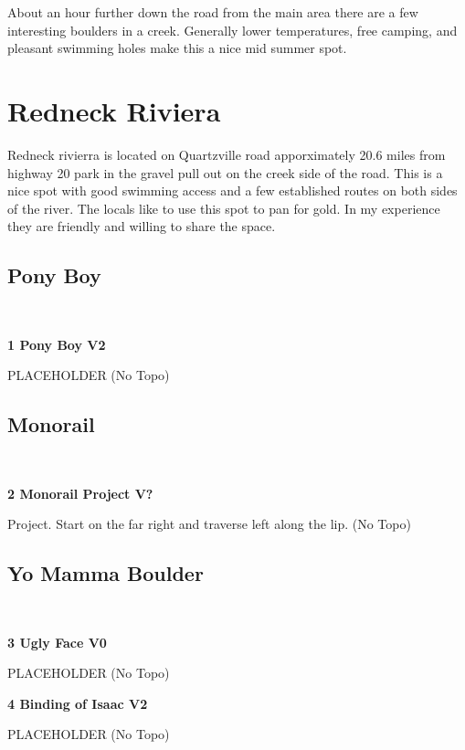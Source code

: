 \begin{multicols}{2}
About an hour further down the road from the main area there are a few interesting boulders in a creek. Generally lower temperatures, free camping, and pleasant swimming holes make this a nice mid summer spot.

		\section{Redneck Riviera}\label{sa:Redneck Riviera}
	Redneck rivierra is located on Quartzville road apporximately 20.6 miles from highway 20 park in the gravel pull out on the creek side of the road. This is a nice spot with good swimming access and a few established routes on both sides of the river. The locals like to use this spot to pan for gold. In my experience they are friendly and willing to share the space.
			\subsection*{Pony Boy}\label{bf:Pony Boy}
			\
			
					\label{rt:Pony Boy} \colorbox{green!20}{\textbf{1 Pony Boy V2  }}
					\begin{adjustwidth}{1cm}{}
					PLACEHOLDER
						\newline (No Topo) 
					\end{adjustwidth}
			\subsection*{Monorail}\label{bf:Monorail}
			\
			
					\label{rt:Monorail Project} \colorbox{black!20}{\textbf{2 Monorail Project V?  }}
					\begin{adjustwidth}{1cm}{}
					Project. Start on the far right and traverse left along the lip.
						\newline (No Topo) 
					\end{adjustwidth}
			\subsection*{Yo Mamma Boulder}\label{bf:Yo Mamma Boulder}
			\
			
					\label{rt:Ugly Face} \colorbox{green!20}{\textbf{3 Ugly Face V0 \ding{72}  \warn }}
					\begin{adjustwidth}{1cm}{}
					PLACEHOLDER
						\newline (No Topo) 
					\end{adjustwidth}
					\label{rt:Binding of Isaac} \colorbox{green!20}{\textbf{4 Binding of Isaac V2 \ding{72}   \warn }}
					\begin{adjustwidth}{1cm}{}
					PLACEHOLDER
						\newline (No Topo) 
					\end{adjustwidth}

\end{multicols}
